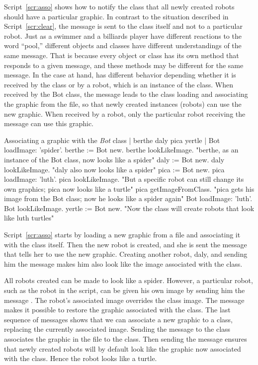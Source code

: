 \documentclass[a4paper,10pt,twoside]{book}
\begin{document}
Script~\ref{scr:asso} shows how to notify the  class that all newly created robots should have a 
particular graphic. In contrast to the situation described in Script~\ref{scr:clear}, the message  is sent to the class  itself and not to a particular robot. Just as a swimmer and a 
billiards player have different reactions to the word “pool,” different objects and classes have 
different understandings of the same message. That is because every object or class has its 
own method that responds to a given message, and these methods may be different for the 
same message. In the case at hand,  has different behavior depending whether it is 
received by the  class or by a robot, which is an instance of the class. When received by the
Bot class, the message  leads to the class loading and associating the 
graphic from the file, so that newly created instances (robots) can use the new graphic. When 
received by a robot, only the particular robot receiving the message can use this graphic. 


\begin{script}[asso]{Associating a graphic with the \emph{Bot} class}
	| berthe daly pica yertle | 
	Bot loadImage: 'spider'. 
	berthe := Bot new. 
	berthe lookLikeImage. 
	"berthe, as an instance of the Bot class, now looks like a spider" 
	daly := Bot new. 
	daly lookLikeImage. 
	"daly also now looks like a spider" 
	pica := Bot new. 
	pica loadImage: 'luth'. 
	pica lookLikeImage. 
	"But a specific robot can still change its own graphics; 
	pica now looks like a turtle" 
	pica getImageFromClass. 
	"pica gets his image from the Bot class; now he looks like a spider again" 
	Bot loadImage: 'luth'. 
	Bot lookLikeImage. 
	yertle := Bot new. 
	"Now the class will create robots that look like luth turtles"
\end{script}

Script~\ref{scr:asso} starts by loading a new graphic from a file and associating it with the  
class  itself. Then the new robot  is created, and she is sent the message that tells her to use 
the new graphic. Creating another robot, daly, and sending him the message  
makes him also look like the image associated with the class. 

All robots created can be made to look like a spider. However, a particular robot, such 
as the robot  in the script, can be given his own image by sending him the message 
. The robot’s associated image overrides the class image. The message 
 makes it possible to restore the graphic associated with the class. The last 
sequence of messages shows that we can associate a new graphic to a class, replacing the 
currently associated image. Sending the message  to the class  
associates the graphic in the file  to the class. Then sending the message 
 ensures that newly created robots will by default look like the graphic 
now associated with the class. Hence the robot  looks like a turtle. 
\end{document}
